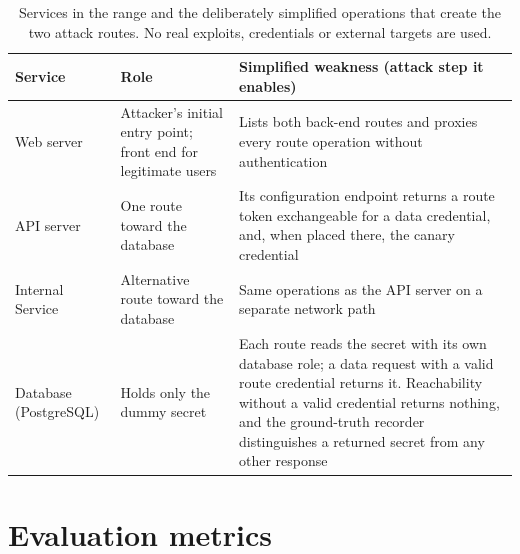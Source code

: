 \documentclass[10pt,a4paper]{article}
\begin{document}
\begin{table}[H]
\centering\small
\caption{Services in the range and the deliberately simplified operations that create the two attack routes. No real exploits, credentials or external targets are used.}
\label{tab:services}
\begin{tabularx}{\textwidth}{P{3.0cm} L L}
\toprule
\textbf{Service} & \textbf{Role} & \textbf{Simplified weakness (attack step it enables)} \\
\midrule
Web server & Attacker's initial entry point; front end for legitimate users & Lists both back-end routes and proxies every route operation without authentication \\
API server & One route toward the database & Its configuration endpoint returns a route token exchangeable for a data credential, and, when placed there, the canary credential \\
Internal Service & Alternative route toward the database & Same operations as the API server on a separate network path \\
Database (PostgreSQL) & Holds only the dummy secret & Each route reads the secret with its own database role; a data request with a valid route credential returns it. Reachability without a valid credential returns nothing, and the ground-truth recorder distinguishes a returned secret from any other response \\
\bottomrule
\end{tabularx}
\end{table}

\section{Evaluation metrics}\label{app:metrics}
\end{document}
